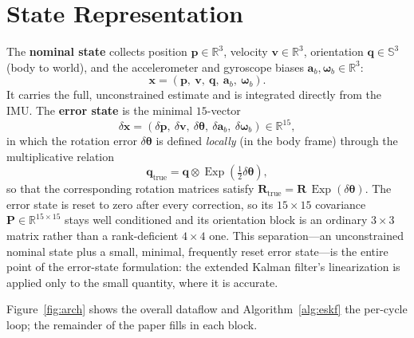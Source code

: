 \documentclass[11pt]{article}
\newcommand{\R}{\mathbf{R}}
\newcommand{\bp}{\mathbf{p}}
\newcommand{\bv}{\mathbf{v}}
\newcommand{\ba}{\mathbf{a}}
\newcommand{\bomega}{\bm{\omega}}
\newcommand{\bq}{\mathbf{q}}
\newcommand{\bP}{\mathbf{P}}
\newcommand{\bx}{\mathbf{x}}
\newcommand{\dtheta}{\delta\bm{\theta}}
\newcommand{\dx}{\delta\bx}
\newcommand{\real}{\mathbb{R}}
\DeclareMathOperator{\Exp}{Exp}
\begin{document}
\section{State Representation}
\label{sec:state}

The \textbf{nominal state} collects position $\bp\in\real^3$, velocity $\bv\in\real^3$, orientation
$\bq\in\mathbb{S}^3$ (body to world), and the accelerometer and gyroscope biases
$\ba_b,\bomega_b\in\real^3$:
\begin{equation}
  \bx = (\bp,\ \bv,\ \bq,\ \ba_b,\ \bomega_b).
\end{equation}
It carries the full, unconstrained estimate and is integrated directly from the IMU. The
\textbf{error state} is the minimal $15$-vector
\begin{equation}
  \dx = (\delta\bp,\ \delta\bv,\ \dtheta,\ \delta\ba_b,\ \delta\bomega_b) \in \real^{15},
\end{equation}
in which the rotation error $\dtheta$ is defined \emph{locally} (in the body frame) through the
multiplicative relation
\begin{equation}
  \bq_{\text{true}} = \bq \otimes \Exp\!\left(\tfrac{1}{2}\dtheta\right),
  \label{eq:localerror}
\end{equation}
so that the corresponding rotation matrices satisfy $\R_{\text{true}} = \R\,\Exp(\dtheta)$. The error
state is reset to zero after every correction, so its $15\times15$ covariance
$\bP\in\real^{15\times15}$ stays well conditioned and its orientation block is an ordinary $3\times3$
matrix rather than a rank-deficient $4\times4$ one. This separation---an unconstrained nominal state
plus a small, minimal, frequently reset error state---is the entire point of the error-state
formulation: the extended Kalman filter's linearization is applied only to the small quantity, where it
is accurate.

Figure~\ref{fig:arch} shows the overall dataflow and Algorithm~\ref{alg:eskf} the per-cycle loop; the
remainder of the paper fills in each block.
\end{document}
